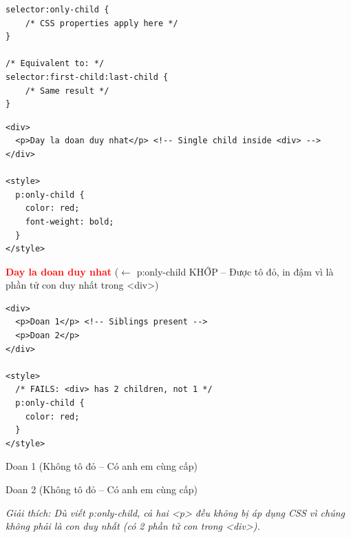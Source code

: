 \begin{codeWindow}
\begin{lstlisting}[language=CSS3]
selector:only-child {
    /* CSS properties apply here */
}

/* Equivalent to: */
selector:first-child:last-child {
    /* Same result */
}
\end{lstlisting}
\end{codeWindow}

\begin{codeWindow}
\begin{lstlisting}[language=HTML5]
<div>
  <p>Day la doan duy nhat</p> <!-- Single child inside <div> -->
</div>

<style>
  p:only-child {
    color: red;
    font-weight: bold;
  }
</style>
\end{lstlisting}
\end{codeWindow}

\begin{browserWindow}
\sffamily\small
\textcolor{red}{\textbf{Day la doan duy nhat}} {\scriptsize\textcolor{gray!60}{($\leftarrow$ p:only-child KHỚP -- Được tô đỏ, in đậm vì là phần tử con duy nhất trong <div>)}}
\end{browserWindow}

\begin{codeWindow}
\begin{lstlisting}[language=HTML5]
<div>
  <p>Doan 1</p> <!-- Siblings present -->
  <p>Doan 2</p>
</div>

<style>
  /* FAILS: <div> has 2 children, not 1 */
  p:only-child {
    color: red;
  }
</style>
\end{lstlisting}
\end{codeWindow}

\begin{browserWindow}
\sffamily\small
Doan 1 {\scriptsize\textcolor{gray!60}{(Không tô đỏ -- Có anh em cùng cấp)}} \par\vspace{2pt}
Doan 2 {\scriptsize\textcolor{gray!60}{(Không tô đỏ -- Có anh em cùng cấp)}} \par\vspace{4pt}
{\scriptsize\textcolor{gray!60}{\textit{Giải thích: Dù viết p:only-child, cả hai <p> đều không bị áp dụng CSS vì chúng không phải là con duy nhất (có 2 phần tử con trong <div>).}}}
\end{browserWindow}

